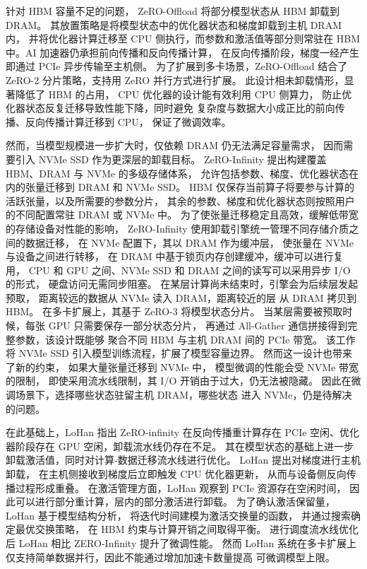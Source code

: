\documentclass[bachelor,openany,oneside,color,AutoFakeBold=true]{buaathesis}
\begin{document}
针对 HBM 容量不足的问题，
ZeRO-Offload 将部分模型状态从 HBM 卸载到 DRAM。
其放置策略是将模型状态中的优化器状态和梯度卸载到主机 DRAM 内，
并将优化器计算迁移至 CPU 侧执行，而参数和激活值等部分则常驻在
HBM 中。AI 加速器仍承担前向传播和反向传播计算，
在反向传播阶段，梯度一经产生即通过 PCIe 异步传输至主机侧。
为了扩展到多卡场景，ZeRO-Offload 
结合了 ZeRO-2 分片策略，支持用 ZeRO 并行方式进行扩展。
此设计相未卸载情形，显著降低了 HBM 的占用，
CPU 优化器的设计能有效利用 CPU 侧算力，
防止优化器状态反复迁移导致性能下降，同时避免
复杂度与数据大小成正比的前向传播、反向传播计算迁移到 CPU，
保证了微调效率。


然而，当模型规模进一步扩大时，仅依赖 DRAM 仍无法满足容量需求，
因而需要引入 NVMe SSD 作为更深层的卸载目标。
ZeRO-Infinity 提出构建覆盖 HBM、DRAM 与 NVMe 的多级存储体系，
允许包括参数、梯度、优化器状态在内的张量迁移到 DRAM 和 NVMe SSD。
HBM 仅保存当前算子将要参与计算的活跃张量，以及所需要的参数分片，
其余的参数、梯度和优化器状态则按照用户的不同配置常驻 DRAM 或 NVMe 中。
为了使张量迁移稳定且高效，缓解低带宽的存储设备对性能的影响，
ZeRO-Infinity 使用卸载引擎统一管理不同存储介质之间的数据迁移，
在 NVMe 配置下，其以 DRAM 作为缓冲层，
使张量在 NVMe 与设备之间进行转移，
在 DRAM 中基于锁页内存创建缓冲，缓冲可以进行复用，
CPU 和 GPU 之间、NVMe SSD 和 DRAM 之间的读写可以采用异步 I/O 的形式，
硬盘访问无需同步阻塞。
在某层计算尚未结束时，引擎会为后续层发起预取，
距离较远的数据从 NVMe 读入 DRAM，距离较近的层
从 DRAM 拷贝到 HBM。
在多卡扩展上，其基于 ZeRO-3 将模型状态分片。
当某层需要被预取时候，每张 GPU 只需要保存一部分状态分片，
再通过 All-Gather 通信拼接得到完整参数，该设计既能够
聚合不同 HBM 与主机 DRAM 间的 PCIe 带宽。
该工作
将 NVMe SSD 引入模型训练流程，扩展了模型容量边界。
然而这一设计也带来了新的约束，
如果大量张量迁移到 NVMe 中，
模型微调的性能会受 NVMe 带宽的限制，
即使采用流水线限制，其 I/O 开销由于过大，仍无法被隐藏。
因此在微调场景下，选择哪些状态驻留主机 DRAM，哪些状态
进入 NVMe，仍是待解决的问题。

在此基础上，LoHan 指出 ZeRO-infinity 在反向传播重计算存在 
PCIe 空闲、优化器阶段存在 GPU 空闲，卸载流水线仍存在不足。
其在模型状态的基础上进一步卸载激活值，同时对计算-数据迁移流水线进行优化。
LoHan 提出对梯度进行主机卸载，
在主机侧接收到梯度后立即触发 CPU 优化器更新，
从而与设备侧反向传播过程形成重叠。
在激活管理方面，LoHan 观察到 PCIe 资源存在空闲时间，
因此可以进行部分重计算，层内的部分激活进行卸载。
为了确认激活保留量，LoHan 基于模型结构分析，
将迭代时间建模为激活交换量的函数，
并通过搜索确定最优交换策略，
在 HBM 约束与计算开销之间取得平衡。
进行调度流水线优化后 LoHan 相比 ZERO-Infinity
提升了微调性能。
然而 LoHan 系统在多卡扩展上
仅支持简单数据并行，因此不能通过增加加速卡数量提高
可微调模型上限。
\end{document}
